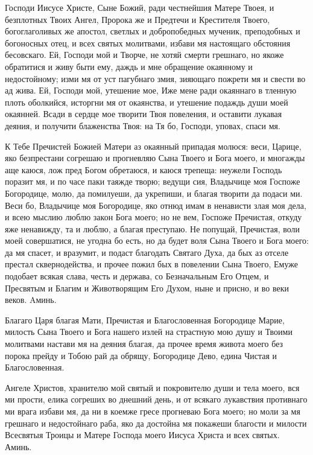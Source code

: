 \begin{mymulticols}

Господи Иисусе Христе, Сыне Божий, ради честнейшия Матере Твоея, и безплотных Твоих Ангел, Пророка же и Предтечи и Крестителя Твоего, богоглаголивых же апостол, светлых и добропобедных мученик, преподобных и богоносных отец, и всех святых молитвами, избави мя настоящаго обстояния бесовскаго. Ей, Господи мой и Творче, не хотяй смерти грешнаго, но якоже обратитися и живу быти ему, даждь и мне обращение окаянному и недостойному; изми мя от уст пагубнаго змия, зияющаго пожрети мя и свести во ад жива. Ей, Господи мой, утешение мое, Иже мене ради окаяннаго в тленную плоть оболкийся, исторгни мя от окаянства, и утешение подаждь души моей окаянней. Всади в сердце мое творити Твоя повеления, и оставити лукавая деяния, и получити блаженства Твоя: на Тя бо, Господи, уповах, спаси мя.


К Тебе Пречистей Божией Матери аз окаянный припадая молюся: веси, Царице, яко безпрестани согрешаю и прогневляю Сына Твоего и Бога моего, и многажды аще каюся, лож пред Богом обретаюся, и каюся трепеща: неужели Господь поразит мя, и по часе паки таяжде творю; ведущи сия, Владычице моя Госпоже Богородице, молю, да помилуеши, да укрепиши, и благая творити да подаси ми. Веси бо, Владычице моя Богородице, яко отнюд имам в ненависти злая моя дела, и всею мыслию люблю закон Бога моего; но не вем, Госпоже Пречистая, откуду яже ненавижду, та и люблю, а благая преступаю. Не попущай, Пречистая, воли моей совершатися, не угодна бо есть, но да будет воля Сына Твоего и Бога моего: да мя спасет, и вразумит, и подаст благодать Святаго Духа, да бых аз отселе престал сквернодейства, и прочее пожил бых в повелении Сына Твоего, Емуже подобает всякая слава, честь и держава, со Безначальным Его Отцем, и Пресвятым и Благим и Животворящим Его Духом, ныне и присно, и во веки веков. Aминь.


Благаго Царя благая Мати, Пречистая и Благословенная Богородице Марие, милость Сына Твоего и Бога нашего излей на страстную мою душу и Твоими молитвами настави мя на деяния благая, да прочее время живота моего без порока прейду и Тобою рай да обрящу, Богородице Дево, едина Чистая и Благословенная.


Ангеле Христов, хранителю мой святый и покровителю души и тела моего, вся ми прости, елика согреших во днешний день, и от всякаго лукавствия противнаго ми врага избави мя, да ни в коемже гресе прогневаю Бога моего; но моли за мя грешнаго и недостойнаго раба, яко да достойна мя покажеши благости и милости Всесвятыя Троицы и Матере Господа моего Иисуса Христа и всех святых. Аминь.


\end{mymulticols}
